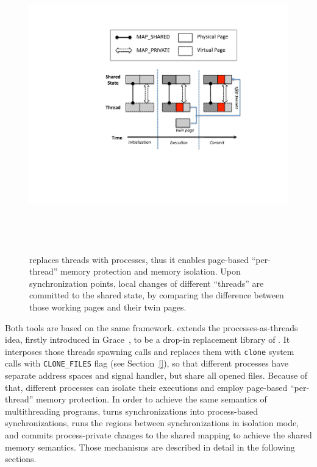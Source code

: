 \label{sec:sheriffframework}


%
\begin{figure}[!t]
\centering
\includegraphics[height=5in]{sheriff/figure/sheriffframework.pdf}
\caption{
\Sheriff{} replaces threads with processes, thus it enables page-based ``per-thread'' memory protection and memory isolation. Upon synchronization points, local changes of different ``threads'' are committed to the shared state, by comparing the difference between those working pages and their twin pages. \label{fig:overview}}
\end{figure}

Both tools are based on the same \sheriff{} framework. \sheriff{} extends the processes-as-threads idea, firstly introduced in Grace~\cite{grace}, to be a drop-in replacement library of \pthreads{}. It interposes those threads spawning calls and replaces them with \texttt{clone} system calls with \texttt{CLONE\_FILES} flag (see Section~\ref{}), so that different processes have separate address spaces and signal handler, but share all opened files. Because of that, different processes can isolate their executions and employ page-based ``per-thread'' memory protection. In order to achieve the same semantics of multithreading programs, \sheriff{} turns synchronizations into process-based synchronizations, runs the regions between synchronizations in isolation mode, and commits process-private changes to the shared mapping to achieve the shared memory semantics. Those mechanisms are described in detail in the following sections. 

